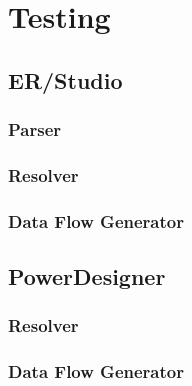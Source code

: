\section{Testing}

\subsection{ER/Studio}

\subsubsection{Parser}

\subsubsection{Resolver}

\subsubsection{Data Flow Generator}

\subsection{PowerDesigner}

\subsubsection{Resolver}

\subsubsection{Data Flow Generator}


